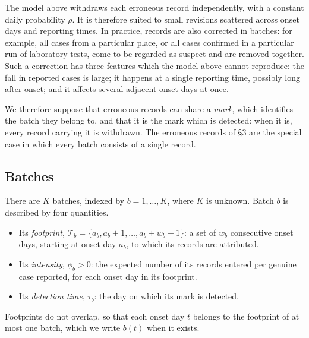 \documentclass[11pt,a4paper]{article}
\newcommand{\Tb}{\mathcal{T}_b}
\begin{document}
The model above withdraws each erroneous record independently, with a constant
daily probability $\rho$. It is therefore suited to small revisions scattered
across onset days and reporting times. In practice, records are also corrected
in batches: for example, all cases from a particular place, or all cases
confirmed in a particular run of laboratory tests, come to be regarded as
suspect and are removed together. Such a correction has three features which
the model above cannot reproduce: the fall in reported cases is large; it
happens at a single reporting time, possibly long after onset; and it affects
several adjacent onset days at once.

We therefore suppose that erroneous records can share a \emph{mark}, which
identifies the batch they belong to, and that it is the mark which is detected:
when it is, every record carrying it is withdrawn. The erroneous records of
\S3 are the special case in which every batch consists of a single record.

\subsection{Batches}

There are $K$ batches, indexed by $b=1,\dots,K$, where $K$ is unknown. Batch
$b$ is described by four quantities.
\begin{itemize}[itemsep=2pt]
\item Its \emph{footprint}, $\Tb=\{a_b,a_b+1,\dots,a_b+w_b-1\}$: a set of $w_b$
consecutive onset days, starting at onset day $a_b$, to which its records are
attributed.
\item Its \emph{intensity}, $\phi_b>0$: the expected number of its records
entered per genuine case reported, for each onset day in its footprint.
\item Its \emph{detection time}, $\tau_b$: the day on which its mark is
detected.
\end{itemize}
Footprints do not overlap, so that each onset day $t$ belongs to the footprint
of at most one batch, which we write $b(t)$ when it exists.
\end{document}
